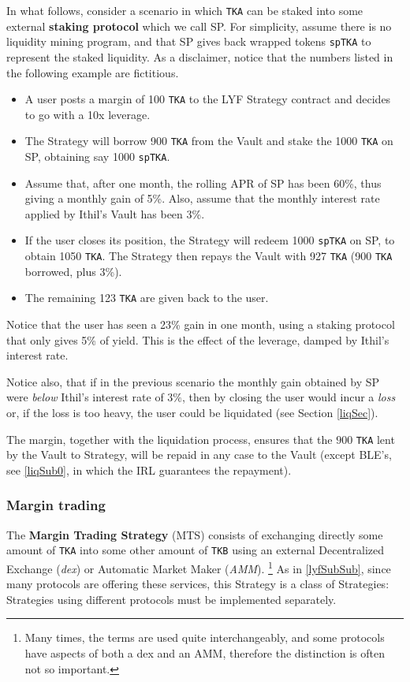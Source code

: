 \documentclass[a4paper,10 pt]{article}
\theoremstyle{definition}
\begin{document}
In what follows, consider a scenario in which \verb|TKA| can be staked into some external {\bf staking protocol} which we call SP. For simplicity, assume there is no liquidity mining program, and that SP gives back wrapped tokens \verb|spTKA| to represent the staked liquidity. As a disclaimer, notice that the numbers listed in the following example are fictitious.

\begin{itemize}
\item A user posts a margin of 100 \verb|TKA| to the LYF Strategy contract and decides to go with a 10x leverage.
\item The Strategy will borrow 900 \verb|TKA| from the Vault and stake the 1000 \verb|TKA| on SP, obtaining say 1000 \verb|spTKA|.
\item Assume that, after one month, the rolling APR of SP has been 60\%, thus giving a monthly gain of 5\%. Also, assume that the monthly interest rate applied by Ithil's Vault has been 3\%.
\item If the user closes its position, the Strategy will redeem 1000 \verb|spTKA| on SP, to obtain 1050 \verb|TKA|. The Strategy then repays the Vault with 927 \verb|TKA| (900 \verb|TKA| borrowed, plus 3\%). 
\item The remaining 123 \verb|TKA| are given back to the user.
\end{itemize}
 Notice that the user has seen a 23\% gain in one month, using a staking protocol that only gives 5\% of yield. This is the effect of the leverage, damped by Ithil's interest rate.

Notice also, that if in the previous scenario the monthly gain obtained by SP were {\it below} Ithil's interest rate of $3\%$, then by closing the user would incur a {\it loss} or, if the loss is too heavy, the user could be liquidated (see Section \ref{liqSec}).

The margin, together with the liquidation process, ensures that the $900$ \verb|TKA| lent by the Vault to Strategy, will be repaid in any case to the Vault (except BLE's, see \ref{liqSub0}, in which the IRL guarantees the repayment).

\subsubsection{Margin trading}\label{mtSubSub}

The {\bf Margin Trading Strategy} (MTS) consists of exchanging directly some amount of \verb|TKA| into some other amount of \verb|TKB| using an external Decentralized Exchange ({\it dex}) or Automatic Market Maker ({\it AMM}). \footnote{Many times, the terms are used quite interchangeably, and some protocols have aspects of both a dex and an AMM, therefore the distinction is often not so important.}  As in \ref{lyfSubSub}, since many protocols are offering these services, this Strategy is a class of Strategies: Strategies using different protocols must be implemented separately.
\end{document}
